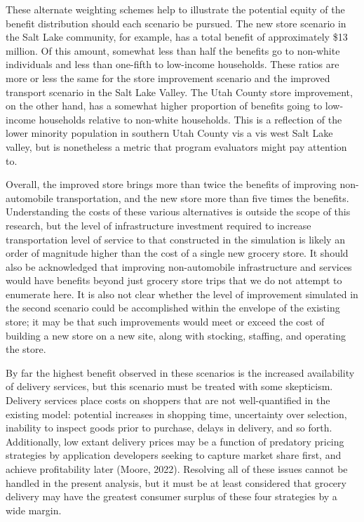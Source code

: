 \documentclass[
  letterpaper,
  number,
  review,
  3p]{elsarticle}
\begin{document}
These alternate weighting schemes help to illustrate the potential
equity of the benefit distribution should each scenario be pursued. The
new store scenario in the Salt Lake community, for example, has a total
benefit of approximately \$13 million. Of this amount, somewhat less
than half the benefits go to non-white individuals and less than
one-fifth to low-income households. These ratios are more or less the
same for the store improvement scenario and the improved transport
scenario in the Salt Lake Valley. The Utah County store improvement, on
the other hand, has a somewhat higher proportion of benefits going to
low-income households relative to non-white households. This is a
reflection of the lower minority population in southern Utah County vis
a vis west Salt Lake valley, but is nonetheless a metric that program
evaluators might pay attention to.

Overall, the improved store brings more than twice the benefits of
improving non-automobile transportation, and the new store more than
five times the benefits. Understanding the costs of these various
alternatives is outside the scope of this research, but the level of
infrastructure investment required to increase transportation level of
service to that constructed in the simulation is likely an order of
magnitude higher than the cost of a single new grocery store. It should
also be acknowledged that improving non-automobile infrastructure and
services would have benefits beyond just grocery store trips that we do
not attempt to enumerate here. It is also not clear whether the level of
improvement simulated in the second scenario could be accomplished
within the envelope of the existing store; it may be that such
improvements would meet or exceed the cost of building a new store on a
new site, along with stocking, staffing, and operating the store.

By far the highest benefit observed in these scenarios is the increased
availability of delivery services, but this scenario must be treated
with some skepticism. Delivery services place costs on shoppers that are
not well-quantified in the existing model: potential increases in
shopping time, uncertainty over selection, inability to inspect goods
prior to purchase, delays in delivery, and so forth. Additionally, low
extant delivery prices may be a function of predatory pricing strategies
by application developers seeking to capture market share first, and
achieve profitability later (Moore, 2022). Resolving all of these issues
cannot be handled in the present analysis, but it must be at least
considered that grocery delivery may have the greatest consumer surplus
of these four strategies by a wide margin.
\end{document}
